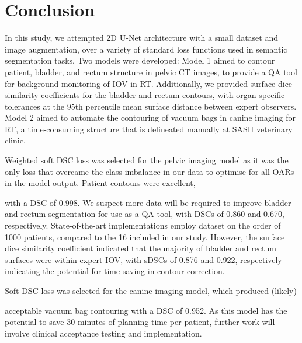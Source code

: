 \chapter{Conclusion}
\label{ch:conclusion}

In this study, we attempted 2D U-Net architecture with a small dataset and image augmentation, over a variety of standard loss functions used in semantic segmentation tasks. Two models were developed: Model 1 aimed to contour patient, bladder, and rectum structure in pelvic CT images, to provide a QA tool for background monitoring of IOV in RT. Additionally, we provided surface dice similarity coefficients for the bladder and rectum contours, with organ-specific tolerances at the 95th percentile mean surface distance between expert observers. Model 2 aimed to automate the contouring of vacuum bags in canine imaging for RT, a time-consuming structure that is delineated manually at SASH veterinary clinic.

Weighted soft DSC loss was selected for the pelvic imaging model as it was the only loss that overcame the class imbalance in our data to optimise for all OARs in the model output. Patient contours were excellent,


with a DSC of 0.998. We suspect more data will be required to improve bladder and rectum segmentation for use as a QA tool, with DSCs of 0.860 and 0.670, respectively. State-of-the-art implementations employ dataset on the order of 1000 patients, compared to the 16 included in our study. However, the surface dice similarity coefficient indicated that the majority of bladder and rectum surfaces were within expert IOV, with sDSCs of 0.876 and 0.922, respectively - indicating the potential for time saving in contour correction.

Soft DSC loss was selected for the canine imaging model, which produced (likely)


acceptable vacuum bag contouring with a DSC of 0.952. As this model has the potential to save 30 minutes of planning time per patient, further work will involve clinical acceptance testing and implementation.


